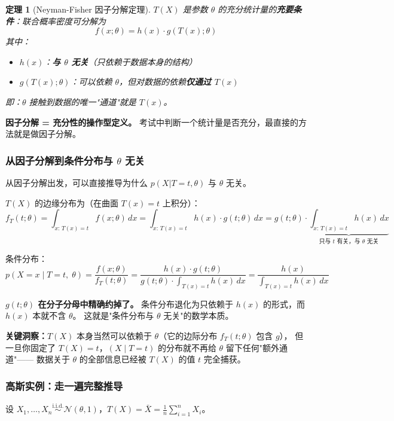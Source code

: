 \documentclass[12pt,a4paper]{ctexart}
\newtheorem{theorem}{定理}[section]
\theoremstyle{definition}
\newcommand{\iid}{\overset{\text{i.i.d.}}{\sim}}
\begin{document}
\begin{theorem}[Neyman-Fisher 因子分解定理]
$T(X)$ 是参数 $\theta$ 的充分统计量的\textbf{充要条件}：联合概率密度可分解为
\[
f(x; \theta) = h(x) \cdot g(T(x); \theta)
\]
其中：
\begin{itemize}[nosep]
  \item $h(x)$：\textbf{与 $\theta$ 无关}（只依赖于数据本身的结构）
  \item $g(T(x);\theta)$：可以依赖 $\theta$，但对数据的依赖\textbf{仅通过 $T(x)$}
\end{itemize}
即：$\theta$ 接触到数据的唯一"通道"就是 $T(x)$。
\end{theorem}

\textbf{因子分解 = 充分性的操作型定义。} 考试中判断一个统计量是否充分，最直接的方法就是做因子分解。

\subsubsection{从因子分解到条件分布与 $\theta$ 无关}

从因子分解出发，可以直接推导为什么 $p(X|T=t,\theta)$ 与 $\theta$ 无关。

$T(X)$ 的边缘分布为（在曲面 $T(x)=t$ 上积分）：
\[
f_T(t; \theta) = \int_{x:\,T(x)=t} f(x;\theta)\,dx
               = \int_{x:\,T(x)=t} h(x) \cdot g(t; \theta)\,dx
               = g(t; \theta) \cdot \underbrace{\int_{x:\,T(x)=t} h(x)\,dx}_{\text{只与 }t\text{ 有关，与 }\theta\text{ 无关}}
\]

条件分布：
\[
p(X=x \mid T=t,\; \theta)
= \frac{f(x;\theta)}{f_T(t;\theta)}
= \frac{h(x) \cdot g(t;\theta)}{g(t;\theta) \cdot \int_{T(x)=t} h(x)\,dx}
= \frac{h(x)}{\int_{T(x)=t} h(x)\,dx}
\]

\textbf{$g(t;\theta)$ 在分子分母中精确约掉了。} 条件分布退化为只依赖于 $h(x)$ 的形式，而 $h(x)$ 本就不含 $\theta$。
这就是"条件分布与 $\theta$ 无关"的数学本质。

\textbf{关键洞察：}$T(X)$ 本身当然可以依赖于 $\theta$（它的边际分布 $f_T(t;\theta)$ 包含 $g$），
但一旦你固定了 $T(X)=t$，$(X \mid T=t)$ 的分布就不再给 $\theta$ 留下任何"额外通道"——
数据关于 $\theta$ 的全部信息已经被 $T(X)$ 的值 $t$ 完全捕获。

\subsubsection{高斯实例：走一遍完整推导}

设 $X_1,\ldots,X_n \iid \mathcal{N}(\theta, 1)$，$T(X) = \bar{X} = \frac{1}{n}\sum_{i=1}^n X_i$。
\end{document}
